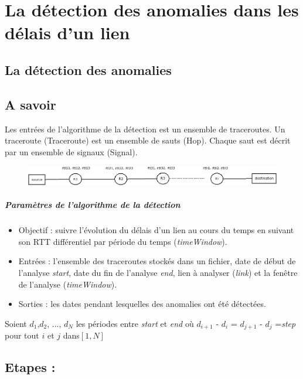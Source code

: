 
\chapter{La détection des anomalies dans les délais d'un lien}
\section{La détection des anomalies}
\section{A savoir}

Les entrées de l'algorithme de la détection est un ensemble de traceroutes. Un traceroute (Traceroute) est un ensemble de sauts (Hop). Chaque saut est décrit par un ensemble de signaux (Signal). 

\begin{figure}
	\centering
	\includegraphics[width=1\linewidth]{illustrations/traceroute}
	\caption{}
	\label{fig:traceroute}
\end{figure}

\paragraph{Paramètres de l'algorithme de la détection}

\begin{itemize}
		\item  Objectif : suivre l'évolution du délais d'un lien au cours du temps en suivant son RTT différentiel par période du temps (\textit{timeWindow}).
	\item Entrées : l'ensemble des traceroutes stockés dans un fichier, date de début de l'analyse \textit{start}, date du fin de l'analyse \textit{end}, lien à analyser (\textit{link}) et la fenêtre de l'analyse (\textit{timeWindow}).
	\item Sorties : les dates pendant lesquelles des anomalies ont été détectées.
\end{itemize}

Soient $ d_1 $,$  d_2 $, ..., $ d_N $ les périodes entre \textit{start} et \textit{end} où $  d_{i+1} $ - $  d_{i} $ = $  d_{j+1} $ - $  d_{j} $ =\textit{step} pour tout $ i $ et $ j $ dans$  [1,N] $
\section{Etapes : }

